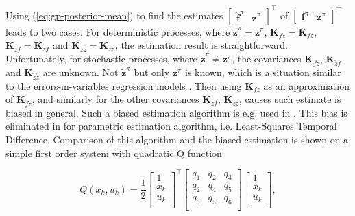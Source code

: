 \documentclass{ifacconf}
\begin{document}
Using (\ref{eq:gp-posterior-mean}) to find the estimates $\left[\begin{array}{cc}\hat{\mathbf{f}}^{\pi} & \mathbf{\hat{z}}^{\pi}\end{array}\right]^{\top}$ of $\left[\begin{array}{cc}\mathbf{f}^{\pi} & \mathbf{z}^{\pi}\end{array}\right]^{\top}$ leads to two cases. For deterministic processes, where $\tilde{\mathbf{z}}^{\pi}=\mathbf{z}^{\pi}$, $\mathbf{K}_{f\tilde{z}}=\mathbf{K}_{fz}$, $\mathbf{K}_{\tilde{z}f}=\mathbf{K}_{zf}$ and $\mathbf{K}_{\tilde{z}\tilde{z}}=\mathbf{K}_{zz}$, the estimation result is straightforward. Unfortunately, for stochastic processes, where $\tilde{\mathbf{z}}^{\pi}\neq\mathbf{z}^{\pi}$, the covariances $\mathbf{K}_{f\tilde{z}}$, $\mathbf{K}_{\tilde{z}f}$ and $\mathbf{K}_{\tilde{z}\tilde{z}}$ are unknown. Not $\tilde{\mathbf{z}}^{\pi}$ but only $\mathbf{z}^{\pi}$ is known, which is a situation similar to the errors-in-variables regression models \citep{ecc19ref:Young_Recursive_estimation}. Then using $\mathbf{K}_{fz}$ as an approximation of $\mathbf{K}_{f\tilde{z}}$, and similarly for the other covariances $\mathbf{K}_{zf}$, $\mathbf{K}_{zz}$, causes such estimate is biased in general. Such a biased estimation algorithm is e.g. used in \citep{ecc19ref:Engel_Bayes_Meets_Bellman}. This bias is eliminated in \citep{ecc19ref:Bratke_Linear_Least_Squares_Algo} for parametric estimation algorithm, i.e. Least-Squares Temporal Difference. Comparison of this algorithm and the biased estimation is shown on a simple first order system with quadratic Q function

\begin{equation}
Q(x_{k},u_{k})=\frac{1}{2}
\left[\begin{array}{c}1\\x_{k}\\u_{k}\\\end{array}\right]^{\top}
\left[\begin{array}{ccc}q_{1} & q_{2} & q_{3}\\q_{2} & q_{4} & q_{5}\\q_{3} & q_{5} & q_{6}\\\end{array}\right]
\left[\begin{array}{ccc}1\\x_{k}\\u_{k}\\\end{array}\right],\label{eq:quadratic-q-function}
\end{equation}
\end{document}
